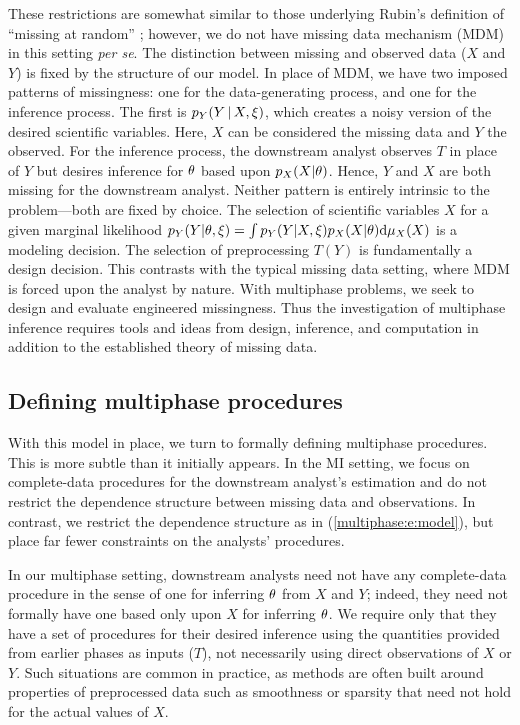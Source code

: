 These restrictions are somewhat similar to those underlying Rubin's definition of ``missing at random'' \citeyearpar{Rubin1976}; however, we do not have missing data mechanism (MDM) in this setting \emph{per se}.
The distinction between missing and observed data ($X$ and $Y$) is fixed by the structure of our model.
In place of MDM, we have two imposed patterns of missingness: one for the data-generating process, and one for the inference process.
The first is $p_Y(Y \, | \, X, \xi)$, which creates a noisy version of the desired scientific variables.
Here, $X$ can be considered the missing data and $Y$ the observed.
For the inference process, the downstream analyst observes $T$ in place of $Y$ but desires inference for $\theta$ based upon $p_X(X | \theta)$.
Hence, $Y$ and $X$ are both missing for the downstream analyst.
Neither pattern is entirely intrinsic to the problem---both are fixed by choice.
The selection of scientific variables $X$ for a given marginal likelihood $p_Y(Y | \theta, \xi) = \int p_Y(Y | X, \xi) p_X(X | \theta) \mathrm{d} \mu_{X}(X)$ is a modeling decision.
The selection of preprocessing $T(Y)$ is fundamentally a design decision.
This contrasts with the typical missing data setting, where MDM is forced upon the analyst by nature.
With multiphase problems, we seek to design and evaluate engineered missingness.
Thus the investigation of multiphase inference requires tools and ideas from design, inference, and computation in addition to the established theory of missing data.

\subsection{Defining multiphase procedures}
\label{multiphase:sec:def}

With this model in place, we turn to formally defining multiphase procedures.
This is more subtle than it initially appears.
In the MI setting, we focus on complete-data procedures for the downstream analyst's estimation and do not restrict the dependence structure between missing data and observations.
In contrast, we restrict the dependence structure as in (\ref{multiphase:e:model}), but place far fewer constraints on the analysts' procedures.

In our multiphase setting, downstream analysts need not have any complete-data procedure in the sense of one for inferring $\theta$ from $X$ and $Y$; indeed, they need not formally have one based only upon $X$ for inferring $\theta$.
We require only that they have a set of procedures for their desired inference using the quantities provided from earlier phases as inputs ($T$),  not necessarily  using direct observations of $X$ or $Y$.
Such situations are common in practice, as methods are often built around properties of preprocessed data such as smoothness or sparsity that need not hold for the actual values of $X$.

